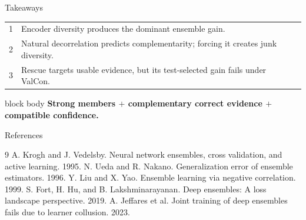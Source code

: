 \documentclass[aspectratio=169,10pt]{beamer}
\newcommand{\takeaway}[1]{%
  \vspace{0.3em}\begin{beamercolorbox}[rounded=true,sep=0.55em]{block body}
  \textbf{#1}
  \end{beamercolorbox}}
\begin{document}
\begin{frame}{Takeaways}
  \begin{center}
  \begin{tabular}{@{}cl@{}}
    \toprule
    1 & Encoder diversity produces the dominant ensemble gain. \\
    2 & Natural decorrelation predicts complementarity; forcing it creates junk diversity. \\
    3 & Rescue targets usable evidence, but its test-selected gain fails under ValCon. \\
    \bottomrule
  \end{tabular}
  \end{center}

  \vspace{0.8em}
  \takeaway{Strong members $+$ complementary correct evidence $+$ compatible confidence.}
\end{frame}

\begin{frame}{References}
  \small
  \begin{thebibliography}{9}
     A. Krogh and J. Vedelsby.
      \newblock Neural network ensembles, cross validation, and active learning. 1995.
     N. Ueda and R. Nakano.
      \newblock Generalization error of ensemble estimators. 1996.
     Y. Liu and X. Yao.
      \newblock Ensemble learning via negative correlation. 1999.
     S. Fort, H. Hu, and B. Lakshminarayanan.
      \newblock Deep ensembles: A loss landscape perspective. 2019.
     A. Jeffares et al.
      \newblock Joint training of deep ensembles fails due to learner collusion. 2023.
  \end{thebibliography}
\end{frame}
\end{document}
